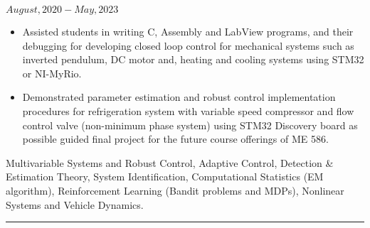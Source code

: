 \noindent {} \hfill $August, 2020 - May, 2023$
\begin{itemize}

        \item Assisted students in writing C, Assembly and LabView programs, and their debugging for developing closed loop control for mechanical systems such as inverted pendulum, DC motor and, heating and cooling systems using STM32 or NI-MyRio.

        \item {} Demonstrated parameter estimation and robust control implementation procedures for refrigeration system with variable speed compressor and flow control valve (non-minimum phase system) using STM32 Discovery board as possible guided final project for the future course offerings of ME 586.
\end{itemize}
\medskip
 Multivariable Systems and Robust Control, Adaptive Control, Detection \& Estimation Theory, System Identification, Computational Statistics (EM algorithm), Reinforcement Learning (Bandit problems and MDPs), Nonlinear Systems and Vehicle Dynamics.

\noindent\rule{\textwidth}{0.4pt}
